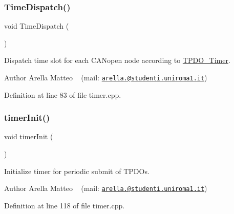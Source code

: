 \subsubsection{\texorpdfstring{Time\+Dispatch()}{TimeDispatch()}}
{\footnotesize\ttfamily void Time\+Dispatch (\begin{DoxyParamCaption}{ }\end{DoxyParamCaption})}



Dispatch time slot for each C\+A\+Nopen node according to \mbox{\hyperlink{_c_a_n_network_page_TPDO_Timer}{T\+P\+D\+O\+\_\+\+Timer}}. 

\begin{DoxyAuthor}{Author}
Arella Matteo ~\newline
 (mail\+: \href{mailto:arella.1646983@studenti.uniroma1.it}{\tt arella.@studenti.\+uniroma1.\+it}) 
\end{DoxyAuthor}


Definition at line 83 of file timer.\+cpp.

\mbox{\label{group___c_a_nopen__timer__module_gaf927959e78504fd1afe1be1e10791ae0}} 
\subsubsection{\texorpdfstring{timer\+Init()}{timerInit()}}
{\footnotesize\ttfamily void timer\+Init (\begin{DoxyParamCaption}{ }\end{DoxyParamCaption})}



Initialize timer for periodic submit of T\+P\+D\+Os. 

\begin{DoxyAuthor}{Author}
Arella Matteo ~\newline
 (mail\+: \href{mailto:arella.1646983@studenti.uniroma1.it}{\tt arella.@studenti.\+uniroma1.\+it}) 
\end{DoxyAuthor}


Definition at line 118 of file timer.\+cpp.

\mbox{\label{group___c_a_nopen__timer__module_gaddf92f4b7b741f7b9fbc827d2e4f2a8b}} 
